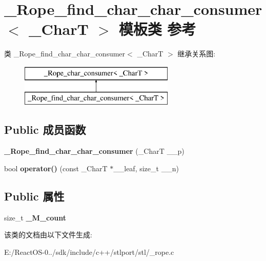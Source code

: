 \hypertarget{class___rope__find__char__char__consumer}{}\section{\+\_\+\+Rope\+\_\+find\+\_\+char\+\_\+char\+\_\+consumer$<$ \+\_\+\+CharT $>$ 模板类 参考}
\label{class___rope__find__char__char__consumer}
类 \+\_\+\+Rope\+\_\+find\+\_\+char\+\_\+char\+\_\+consumer$<$ \+\_\+\+CharT $>$ 继承关系图\+:\begin{figure}[H]
\begin{center}
\leavevmode
\includegraphics[height=2.000000cm]{class___rope__find__char__char__consumer}
\end{center}
\end{figure}
\subsection*{Public 成员函数}
\begin{DoxyCompactItemize}
\item 
\mbox{\label{class___rope__find__char__char__consumer_a4399033b0beab4dd8710bee0c42fcb63}} 
{\bfseries \+\_\+\+Rope\+\_\+find\+\_\+char\+\_\+char\+\_\+consumer} (\+\_\+\+CharT \+\_\+\+\_\+p)
\item 
\mbox{\label{class___rope__find__char__char__consumer_a72cda6f67955d563ab280d863c3fb935}} 
bool {\bfseries operator()} (const \+\_\+\+CharT $\ast$\+\_\+\+\_\+leaf, size\+\_\+t \+\_\+\+\_\+n)
\end{DoxyCompactItemize}
\subsection*{Public 属性}
\begin{DoxyCompactItemize}
\item 
\mbox{\label{class___rope__find__char__char__consumer_a51948a90bb54d726b23b568b91b7988c}} 
size\+\_\+t {\bfseries \+\_\+\+M\+\_\+count}
\end{DoxyCompactItemize}


该类的文档由以下文件生成\+:\begin{DoxyCompactItemize}
\item 
E\+:/\+React\+O\+S-\/0../sdk/include/c++/stlport/stl/\+\_\+rope.\+c\end{DoxyCompactItemize}
